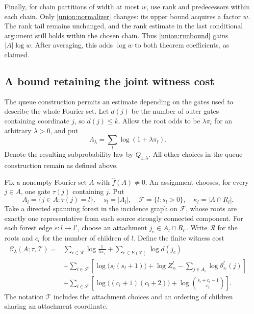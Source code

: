 \documentclass[11pt]{amsart}
\theoremstyle{definition}
\theoremstyle{remark}
\newcommand{\wh}[1]{\widehat{#1}}
\begin{document}
Finally, for chain partitions of width at most $w$, use rank and predecessors within each chain.
Only \eqref{union:normalizer} changes: its upper bound acquires a factor $w$.
The rank tail remains unchanged, and the rank estimate in the last conditional argument still holds within the chosen chain.
Thus \eqref{union:runbound} gains $|A|\log w$.
After averaging, this adds $\log w$ to both theorem coefficients, as claimed.


\subsection{A bound retaining the joint witness cost}

The queue construction permits an estimate depending on the gates used
to describe the whole Fourier set. Let $d(j)$ be the number of outer
gates containing coordinate $j$, so $d(j)\le k$.
Allow the root odds to be $\lambda\pi_l$ for an arbitrary $\lambda>0$,
and put
\[
 \Lambda_\lambda=\sum_l\log(1+\lambda\pi_l).
\]
Denote the resulting subprobability law by $Q_{1,\lambda}$.
All other choices in the queue construction remain as defined above.

Fix a nonempty Fourier set $A$ with $\wh f(A)\ne0$. An assignment chooses, for every
$j\in A$, one gate $\tau(j)$ containing $j$. Put
\[
 A_l=\{j\in A:\tau(j)=l\},\quad s_l=|A_l|,\quad
 \mathcal F=\{l:s_l>0\},\quad \kappa_l=|A\cap R_l|.
\]
Take a directed spanning forest in the incidence graph on $\mathcal F$,
whose roots are exactly one representative from each source strongly connected component.
For each forest edge $e:l\to l'$, choose an attachment
$j_e\in A_l\cap R_{l'}$. Write $\mathcal R$ for the roots and $c_l$
for the number of children of $l$.
Define the finite witness cost
\begin{align*}
 \mathcal C_\lambda(A;\tau,\mathcal T)
  ={}&\sum_{r\in\mathcal R}\log\frac1{\lambda\pi_r}
       +\sum_{e\in E(\mathcal T)}\log d(j_e)\\
    &+\sum_{l\in\mathcal F}\left[
       \log\bigl(s_l(s_l+1)\bigr)+\log Z_{s_l}^l
       -\sum_{j\in A_l}\log\theta_{s_l}^l(j)\right]\\
    &+\sum_{l\in\mathcal F}\left[
       \log\bigl((c_l+1)(c_l+2)\bigr)
       +\log\binom{s_l+c_l-1}{c_l}\right].
\end{align*}
The notation $\mathcal T$ includes the attachment choices and an ordering
of children sharing an attachment coordinate.
\end{document}
